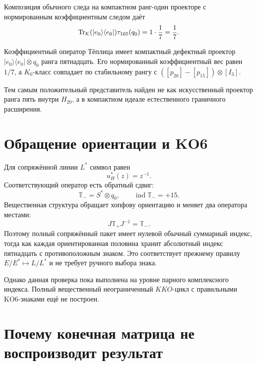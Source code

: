 Композиция обычного следа на компактном ранг-один проекторе с
нормированным коэффициентным следом даёт
\begin{equation}
 \operatorname{Tr}_{\mathcal K}(|e_0\rangle\langle e_0|)
 \tau_{105}(q_0)=1\cdot\frac17=\frac17.
 \label{eq:v5-toeplitz-defect-weight}
\end{equation}

\begin{theorem}
Коэффициентный оператор Тёплица имеет компактный дефектный проектор
$|e_0\rangle\langle e_0|\otimes q_0$ ранга пятнадцать. Его нормированный
коэффициентный вес равен $1/7$, а $K_0$-класс совпадает по стабильному
рангу с $([p_{20}]-[p_{15}])\otimes[I_3]$.
\end{theorem}

Тем самым положительный представитель найден не как искусственный
проектор ранга пять внутри $H_{20}$, а в компактном идеале естественного
граничного расширения.

\section{Обращение ориентации и KO6}

Для сопряжённой линии $L^*$ символ равен
\begin{equation}
 u_H^*(z)=z^{-1}.
\end{equation}
Соответствующий оператор есть обратный сдвиг:
\begin{equation}
 \mathbb T_-=S^*\otimes q_0,
 \qquad
 \operatorname{ind}\mathbb T_-=+15.
\end{equation}
Вещественная структура обращает хопфову ориентацию и меняет два
оператора местами:
\begin{equation}
 J\mathbb T_+J^{-1}=\mathbb T_-.
 \label{eq:v5-toeplitz-J-pair}
\end{equation}
Поэтому полный сопряжённый пакет имеет нулевой обычный суммарный индекс,
тогда как каждая ориентированная половина хранит абсолютный индекс
пятнадцать с противоположным знаком. Это соответствует прежнему правилу
$E/E^*\mapsto L/L^*$ и не требует ручного выбора знака.

Однако данная проверка пока выполнена на уровне парного комплексного
индекса. Полный вещественный неограниченный $KKO$-цикл с правильными
KO6-знаками ещё не построен.

\section{Почему конечная матрица не воспроизводит результат}

